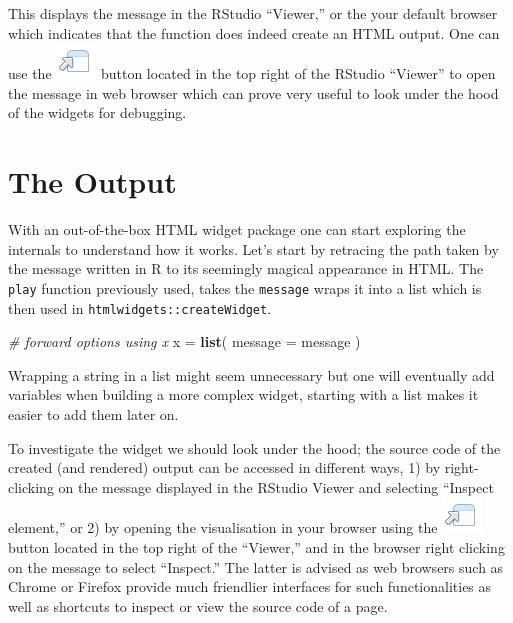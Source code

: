 \documentclass[
]{krantz}
\makeatletter
\newenvironment{Shaded}{\begin{snugshade}}{\end{snugshade}}
\newcommand{\CommentTok}[1]{\textcolor[rgb]{0.37,0.37,0.37}{\textit{#1}}}
\newcommand{\DataTypeTok}[1]{\textcolor[rgb]{0.27,0.27,0.27}{#1}}
\newcommand{\KeywordTok}[1]{\textcolor[rgb]{0.27,0.27,0.27}{\textbf{#1}}}
\newcommand{\NormalTok}[1]{#1}
\newcommand{\StringTok}[1]{\textcolor[rgb]{0.5,0.5,0.5}{#1}}
\newenvironment{kframe}{%
\medskip{}
\setlength{\fboxsep}{.8em}
 \def\at@end@of@kframe{}%
 \ifinner\ifhmode%
  \def\at@end@of@kframe{\end{minipage}}%
  \begin{minipage}{\columnwidth}%
 \fi\fi%
 \def\FrameCommand##1{\hskip\@totalleftmargin \hskip-\fboxsep
 \colorbox{shadecolor}{##1}\hskip-\fboxsep
     \hskip-\linewidth \hskip-\@totalleftmargin \hskip\columnwidth}%
 \MakeFramed {\advance\hsize-\width
   \@totalleftmargin\z@ \linewidth\hsize
   \@setminipage}}%
 {\par\unskip\endMakeFramed%
 \at@end@of@kframe}
\renewenvironment{Shaded}{\begin{kframe}}{\end{kframe}}
\makeatother
\begin{document}
This displays the message in the RStudio ``Viewer,'' or the your default browser which indicates that the function does indeed create an HTML output. One can use the \includegraphics{images/open-in-browser.png} button located in the top right of the RStudio ``Viewer'' to open the message in web browser which can prove very useful to look under the hood of the widgets for debugging.

\hypertarget{the-output}{%
\section{The Output}\label{the-output}}

With an out-of-the-box HTML widget package one can start exploring the internals to understand how it works. Let's start by retracing the path taken by the message written in R to its seemingly magical appearance in HTML. The \texttt{play} function previously used, takes the \texttt{message} wraps it into a list which is then used in \texttt{htmlwidgets::createWidget}.

\begin{Shaded}
\begin{Highlighting}[]
\CommentTok{\# forward options using x}
\NormalTok{x =}\StringTok{ }\KeywordTok{list}\NormalTok{(}
  \DataTypeTok{message =}\NormalTok{ message}
\NormalTok{)}
\end{Highlighting}
\end{Shaded}

Wrapping a string in a list might seem unnecessary but one will eventually add variables when building a more complex widget, starting with a list makes it easier to add them later on.

To investigate the widget we should look under the hood; the source code of the created (and rendered) output can be accessed in different ways, 1) by right-clicking on the message displayed in the RStudio Viewer and selecting ``Inspect element,'' or 2) by opening the visualisation in your browser using the \includegraphics{images/open-in-browser.png} button located in the top right of the ``Viewer,'' and in the browser right clicking on the message to select ``Inspect.'' The latter is advised as web browsers such as Chrome or Firefox provide much friendlier interfaces for such functionalities as well as shortcuts to inspect or view the source code of a page.
\end{document}

